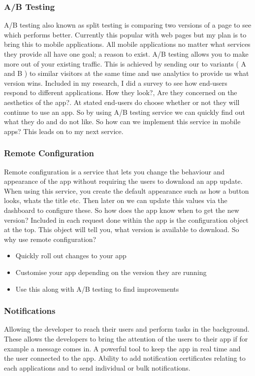 \subsubsection{A/B Testing}
A/B testing also known as split testing is comparing two versions of a page to see which performs better. Currently this popular with web pages but my plan is to bring this to mobile applications. All mobile applications no matter what services they provide all have one goal; a reason to exist. A/B testing allows you to make more out of your existing traffic. This is achieved by sending our to variants ( A and B ) to similar visitors at the same time and use analytics to provide us what version wins. Included in my research, I did a survey to see how end-users respond to different applications. How they look?, Are they concerned on the aesthetics of the app?. At stated end-users do choose whether or not they will continue to use an app. So by using A/B testing service we can quickly find out what they do and do not like. So how can we implement this service in mobile apps? This leads on to my next service.

\subsubsection{Remote Configuration}
Remote configuration is a service that lets you change the behaviour and appearance of the app without requiring the users to download an app update. When using this service, you create the default appearance such as how a button looks, whats the title etc. Then later on we can update this values via the dashboard to configure these. So how does the app know when to get the new version? Included in each request done within the app is the configuration object at the top. This object will tell you, what version is available to download. So why use remote configuration? 
\begin{itemize}
  \item Quickly roll out changes to your app
  \item Customise your app depending on the version they are running
  \item Use this along with A/B testing to find improvements
\end{itemize}

\subsubsection{Notifications}
Allowing the developer to reach their users and perform tasks in the background. These allows the developers to bring the attention of the users to their app if for example a message comes in. A powerful tool to keep the app in real time and the user connected to the app. Ability to add notification certificates relating to each applications and to send individual or bulk notifications.

